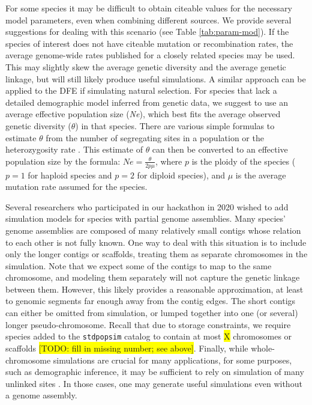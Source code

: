 \documentclass[hidelinks]{article}
\newcommand{\stdpopsim}{\texttt{stdpopsim}\xspace}
\begin{document}
For some species it may be difficult to obtain citeable values for the necessary model parameters, even when combining different sources. We provide several suggestions for dealing with this scenario (see Table \ref{tab:param-mod}).
If the species of interest does not have citeable mutation or recombination rates, the average genome-wide rates published for a closely related species may be used. This may slightly skew the average genetic diversity and the average genetic linkage, but will still likely produce useful simulations. A similar approach can be applied to the DFE if simulating natural selection.
For species that lack a detailed demographic model inferred from genetic data, we suggest to use an average effective population size (\emph{Ne}), which best fits the average observed genetic diversity ($\theta$) in that species. There are various simple formulas to estimate $\theta$ from the number of segregating sites in a population \citep{Watterson1975} or the heterozygosity rate \citep{nei1979mathematical, tajima1983evolutionary}. This estimate of $\theta$ can then be converted to an effective population size by the formula: $Ne=\frac {\theta} {2p\mu}$, where $p$ is the ploidy of the species ($p=1$ for haploid species and $p=2$ for diploid species), and $\mu$ is the average mutation rate assumed for the species.

Several researchers who participated in our hackathon in 2020 wished to add simulation models for species with partial genome assemblies. Many species' genome assemblies
are composed of many relatively small contigs whose relation to each
other is not fully known. One way to deal with this situation is to include only the  longer contigs or scaffolds, treating them as separate chromosomes in the simulation. Note that we expect some of the contigs to map to the same chromosome, and modeling them separately will not capture the genetic linkage between them. However, this likely provides a reasonable approximation, at least to genomic segments far enough away from the contig edges. The short contigs can either be omitted from simulation, or lumped together into one (or several) longer pseudo-chromosome. Recall that due to storage constraints, we require species added to the \stdpopsim catalog to contain at most \colorbox{yellow}{X} chromosomes or scaffolds \colorbox{yellow}{[TODO: fill in missing number; see above]}. Finally, while whole-chromosome simulations are crucial for many applications, for some purposes, such as demographic inference, it may be sufficient to rely on simulation  of many unlinked sites \citep{Gutenkunst2009,Excoffier2013}. In those cases, one may generate useful simulations even without a genome assembly.
\end{document}

